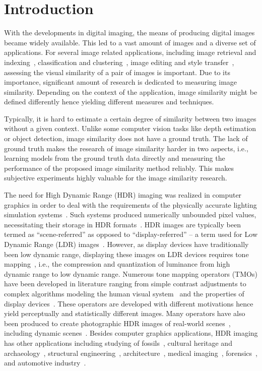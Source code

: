 \chapter{Introduction}
\label{chp:b1}
With the developments in digital imaging, the means of producing digital images became widely available. This led to a vast amount of images and a diverse set of applications. For several image related applications, including image retrieval and indexing~\cite{liu2007survey}, classification and clustering~\cite{kleiman2016toward}, image editing and style transfer~\cite{rawat2018find}, assessing the visual similarity of a pair of images is important. Due to its importance, significant amount of research is dedicated to measuring image similarity. Depending on the context of the application, image similarity might be defined differently hence yielding different measures and techniques.

Typically, it is hard to estimate a certain degree of similarity between two images without a given context. Unlike some computer vision tasks like depth estimation or object detection, image similarity does not have a ground truth. The lack of ground truth makes the research of image similarity harder in two aspects, i.e., learning models from the ground truth data directly and measuring the performance of the proposed image similarity method reliably. This makes subjective experiments highly valuable for the image similarity research.

The need for High Dynamic Range (HDR) imaging was realized in computer graphics in order to deal with the requirements of the physically accurate lighting simulation systems~\cite{glassner1995principles}. Such systems produced numerically unbounded pixel values, necessitating their storage in HDR formats~\cite{ward1998rendering}. HDR images are typically been termed as ``scene-referred'' as opposed to ``display-referred'' -- a term used for Low Dynamic Range (LDR) images~\cite{Rein2010}. However, as display devices have traditionally been low dynamic range, displaying these images on LDR devices requires tone mapping~\cite{Tumb93,Ward97}, i.e., the compression and quantization of luminance from high dynamic range to low dynamic range. Numerous tone mapping operators (TMOs) have been developed in literature ranging from simple contrast adjustments to complex algorithms modeling the human visual system~\cite{Ferw96} and the properties of display devices~\cite{Mantiuk2008}. These operators are developed with different motivations hence yield perceptually and statistically different images. Many operators have also been produced to create photographic HDR images of real-world scenes~\cite{Debe97}, including dynamic scenes~\cite{sen2012robust,kalantari2017deep}. Besides computer graphics applications, HDR imaging has other applications including studying of fossils~\cite{theodor2009high}, cultural heritage and archaeology~\cite{happa2010high}, structural engineering~\cite{grinzato2009seismic}, architecture~\cite{cai2013high}, medical imaging~\cite{harifi2015efficient,rizzi2018visual}, forensics~\cite{brown2010forensic}, and automotive industry~\cite{wu2012fast}.

